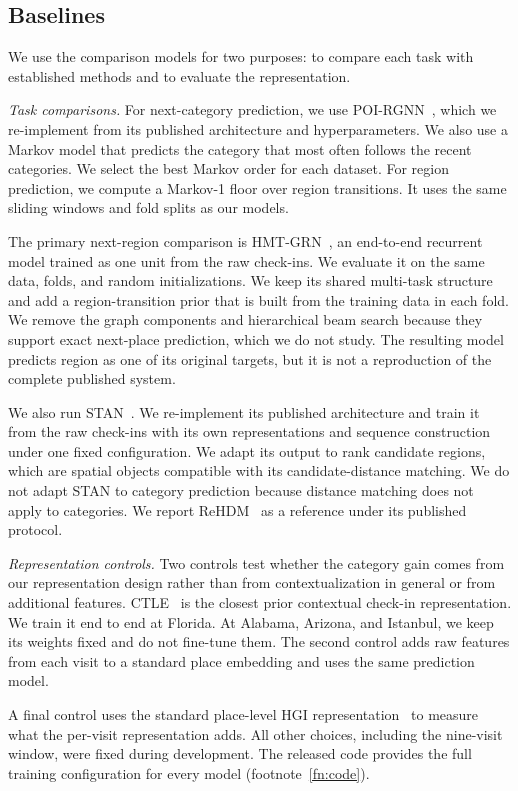 \subsection{Baselines}
\label{sec:setup-baselines}
We use the comparison models for two purposes: to compare each task with established methods and to evaluate the representation.

\emph{Task comparisons.} For next-category prediction, we use POI-RGNN~\cite{capanema2023poirgnn}, which we re-implement from its published architecture and hyperparameters. We also use a Markov model that predicts the category that most often follows the recent categories. We select the best Markov order for each dataset. For region prediction, we compute a Markov-1 floor over region transitions. It uses the same sliding windows and fold splits as our models.

The primary next-region comparison is HMT-GRN~\cite{lim2022hmtgrn}, an end-to-end recurrent model trained as one unit from the raw check-ins. We evaluate it on the same data, folds, and random initializations. We keep its shared multi-task structure and add a region-transition prior that is built from the training data in each fold. We remove the graph components and hierarchical beam search because they support exact next-place prediction, which we do not study. The resulting model predicts region as one of its original targets, but it is not a reproduction of the complete published system.

We also run STAN~\cite{luo2021stan}. We re-implement its published architecture and train it from the raw check-ins with its own representations and sequence construction under one fixed configuration. We adapt its output to rank candidate regions, which are spatial objects compatible with its candidate-distance matching. We do not adapt STAN to category prediction because distance matching does not apply to categories. We report ReHDM~\cite{li2025rehdm} as a reference under its published protocol.

\emph{Representation controls.} Two controls test whether the category gain comes from our representation design rather than from contextualization in general or from additional features. CTLE~\cite{lin2021ctle} is the closest prior contextual check-in representation. We train it end to end at Florida. At Alabama, Arizona, and Istanbul, we keep its weights fixed and do not fine-tune them. The second control adds raw features from each visit to a standard place embedding and uses the same prediction model.

A final control uses the standard place-level HGI representation~\cite{huang2023hgi} to measure what the per-visit representation adds. All other choices, including the nine-visit window, were fixed during development. The released code provides the full training configuration for every model (footnote~\ref{fn:code}).
